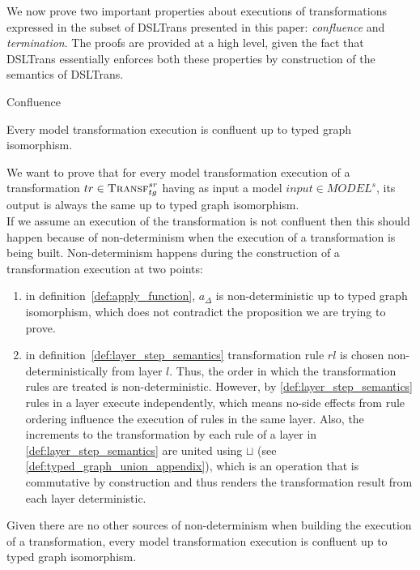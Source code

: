 We now prove two important properties about executions of transformations expressed in the subset of DSLTrans presented in this paper: \emph{confluence} and \emph{termination}. The proofs are provided at a high level, given the fact that DSLTrans essentially enforces both these properties by construction of the semantics of DSLTrans.

\begin{proposition}{Confluence}

Every model transformation execution is confluent up to typed graph isomorphism.
\end{proposition}
\begin{pf}
We want to prove that for every model transformation execution of a transformation $tr\in \textsc{Transf}^{sr}_{tg}$ having as input a model $input \in MODEL^{s}$, its output is always the same up to typed graph isomorphism.\\
If we assume an execution of the transformation is not confluent then this should happen because of non-determinism when the execution of a transformation is being built. Non-determinism happens during the construction of a transformation execution at two points: 
\begin{enumerate}
\item in definition~\ref{def:apply_function}, $a_{\Delta}$ is non-deterministic up to typed graph isomorphism, which does not contradict the proposition we are trying to prove.
\item in definition~\ref{def:layer_step_semantics} transformation rule $rl$ is chosen non-deterministically from layer $l$. Thus, the order in which the transformation rules are treated is non-deterministic. However, by \cref{def:layer_step_semantics} rules in a layer execute independently, which means no-side effects from rule ordering influence the execution of rules in the same layer. Also, the increments to the transformation by each rule of a layer in \cref{def:layer_step_semantics} are united using $\sqcup$ (see \cref{def:typed_graph_union_appendix}), which is an operation that is commutative by construction and thus renders the transformation result from each layer deterministic. 
\end{enumerate}
Given there are no other sources of non-determinism when building the execution of a transformation, every model transformation execution is confluent up to typed graph isomorphism.
\end{pf}

